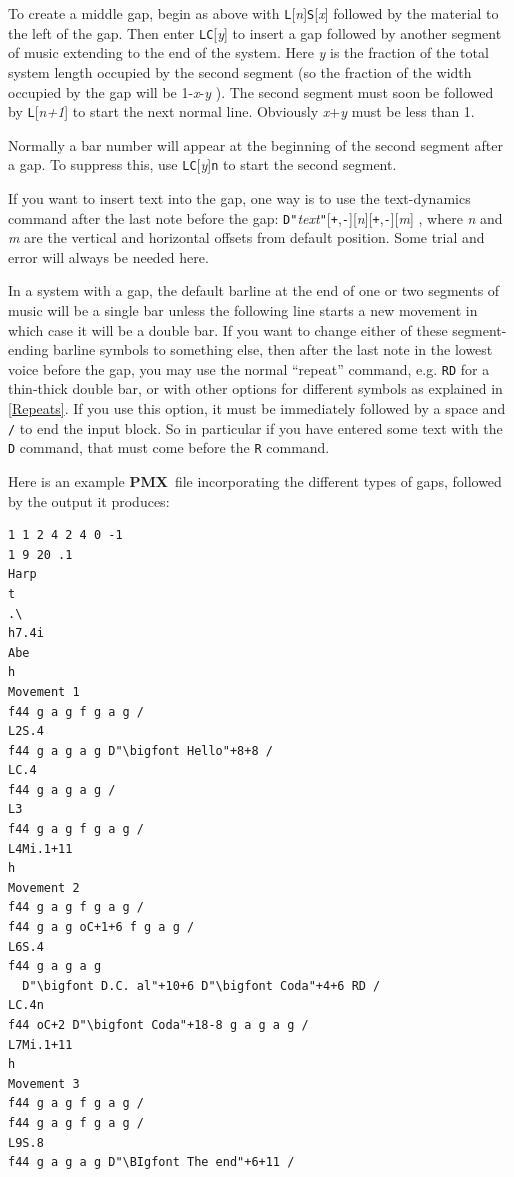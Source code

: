 \documentclass[11pt]{article}
\newcommand\PMXX{\textbf{PMX}}
\newcommand\PMX{\PMXX~}
\begin{document}
To create a middle gap, begin as above with {\tt L}[{\it n}]{\tt S}[{\it x}]
followed by the material to the left of the gap. Then enter {\tt LC}[{\it y}]
to insert a gap followed by another segment of music extending to the end of
the system. Here {\it y} is the fraction of the total system length occupied 
by the second segment (so the fraction of the width occupied by the gap will 
be 1-{\it x}-{\it y} ). The second segment must soon be followed by 
{\tt L}[{\it n+1}] to start the next normal line. Obviously {\it x}+{\it y} 
must be less than 1. 

Normally a bar number will appear at the beginning of the second segment after 
a gap. To suppress this, use {\tt LC}[{\it y}]{\tt n} to start the second 
segment.

If you want to insert text into the gap, one way is to use the text-dynamics 
command after the last note before the gap: 
{\tt D"}{\it text}{\tt "}[{\tt +},{\tt -}][{\it n}][{\tt +},{\tt -}][{\it m}] , where 
{\it n} and {\it m} are the vertical and horizontal offsets from default 
position. Some trial and error will always be needed here.

In a system with a gap, the default barline at the end of one or two segments 
of music will be a single bar unless the following line starts a new movement 
in which case it will be a double bar. If you want to change either of these 
segment-ending barline symbols to something else, then after the last note in 
the lowest voice before the gap, you may use the normal ``repeat'' command,
e.g. {\tt RD} for a thin-thick double bar, or with other options for different
symbols as explained in \ref{Repeats}. If you use this option, it must be 
immediately followed by a space and {\tt /} to end the input block. So in 
particular if you have entered some text with the {\tt D} command, that must
come before the {\tt R} command.

Here is an example \PMX file incorporating the different types of gaps, 
followed by the output it produces:

\begin{verbatim}
1 1 2 4 2 4 0 -1
1 9 20 .1
Harp
t
.\
h7.4i
Abe
h
Movement 1
f44 g a g f g a g /
L2S.4
f44 g a g a g D"\bigfont Hello"+8+8 /
LC.4
f44 g a g a g /
L3
f44 g a g f g a g /
L4Mi.1+11
h
Movement 2
f44 g a g f g a g /
f44 g a g oC+1+6 f g a g /
L6S.4
f44 g a g a g 
  D"\bigfont D.C. al"+10+6 D"\bigfont Coda"+4+6 RD /
LC.4n
f44 oC+2 D"\bigfont Coda"+18-8 g a g a g /
L7Mi.1+11
h
Movement 3
f44 g a g f g a g /
f44 g a g f g a g /
L9S.8
f44 g a g a g D"\BIgfont The end"+6+11 /
\end{verbatim}
\end{document}

